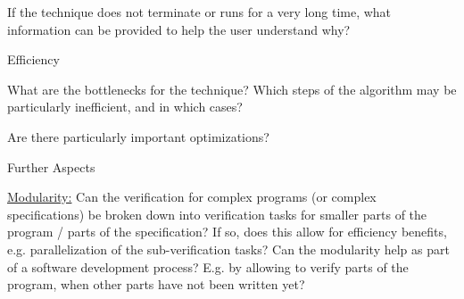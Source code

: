 \documentclass[a4paper]{article}
\begin{document}
\begin{minipage}[t]{0.16\linewidth}
\begin{betterlist}
\begin{betterlist}
			\item If the technique does not terminate or runs for a very long time, what information can be provided to help the user understand why?

		\end{betterlist}
		\item \alert{Efficiency}
		\begin{betterlist}
			\item What are the bottlenecks for the technique? Which steps of the algorithm may be particularly inefficient, and in which cases?

			\item Are there particularly important optimizations?

		\end{betterlist}
		\item \alert{Further Aspects}
		\begin{betterlist}
			\item \underline{Modularity:} Can the verification for complex programs (or complex specifications) be broken down into verification tasks for smaller parts of the program / parts of the specification? If so, does this allow for efficiency benefits, e.g. parallelization of the sub-verification tasks? Can the modularity help as part of a software development process? E.g. by allowing to verify parts of the program, when other parts have not been written yet?


\end{betterlist}
\end{betterlist}
\end{minipage}
\end{document}
